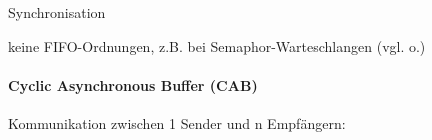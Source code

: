 \documentclass[a4paper]{article}
\begin{document}
\begin{multicols}{3}
\begin{itemize*}
\begin{enumerate*}
            \setcounter{enumi}{1}
            \item Synchronisation
        \end{enumerate*}
        \begin{itemize*}
            \item keine FIFO-Ordnungen, z.B. bei Semaphor-Warteschlangen (vgl. o.)
        \end{itemize*}
    \end{itemize*}


    \paragraph{Cyclic Asynchronous Buffer
        (CAB)}

    Kommunikation zwischen 1 Sender und n Empfängern:


\end{multicols}
\end{document}
